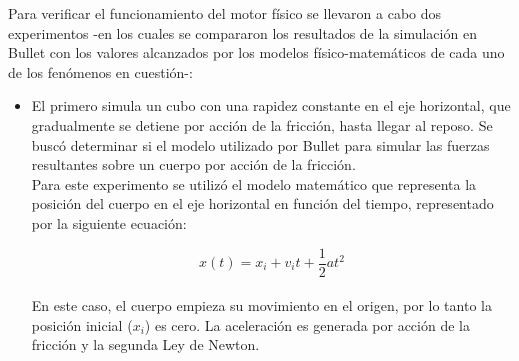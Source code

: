 \documentclass{article}
\begin{document}
Para verificar el funcionamiento del motor f\'isico se llevaron a cabo dos experimentos  -en los cuales se compararon los resultados de la simulaci\'on en Bullet con los valores alcanzados por los modelos f\'isico-matem\'aticos de cada uno de los fen\'omenos en cuesti\'on-:\\
\begin{itemize}
\item El primero simula un cubo con una rapidez constante en el eje horizontal, que gradualmente se detiene por acci\'on de la fricci\'on, hasta llegar al reposo. Se busc\'o determinar si el modelo utilizado por Bullet para simular las fuerzas resultantes sobre un cuerpo por acci\'on de la fricci\'on. \\
Para este experimento se utiliz\'o el modelo matem\'atico que representa la posici\'on del cuerpo en el eje horizontal en funci\'on del tiempo, representado por la siguiente ecuaci\'on:
 
 \begin{equation}
  x(t) = x_i +v_i t+\frac{1}{2} at^2
\end{equation}
\\ En este caso, el cuerpo empieza su movimiento en el origen, por lo tanto la posici\'on inicial ($x_i$) es cero. La aceleraci\'on es generada por acci\'on de la fricci\'on y la segunda Ley de Newton.\\
 

\end{itemize}
\end{document}
